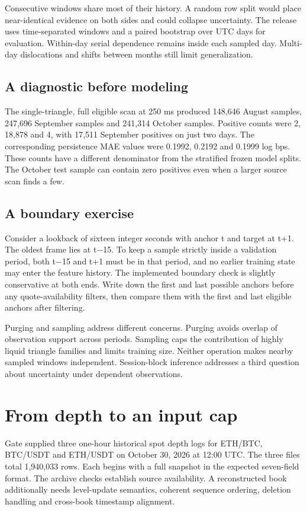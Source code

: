 \documentclass[11pt,oneside,openany]{book}
\begin{document}
Consecutive windows share most of their history. A random row split would place near-identical evidence on both sides and could collapse uncertainty. The release uses time-separated windows and a paired bootstrap over UTC days for evaluation. Within-day serial dependence remains inside each sampled day. Multi-day dislocations and shifts between months still limit generalization.

\section*{A diagnostic before modeling}
The single-triangle, full eligible scan at 250 ms produced 148,646 August samples, 247,696 September samples and 241,314 October samples. Positive counts were 2, 18,878 and 4, with 17,511 September positives on just two days. The corresponding persistence MAE values were 0.1992, 0.2192 and 0.1999 log bps. These counts have a different denominator from the stratified frozen model splits. The October test sample can contain zero positives even when a larger source scan finds a few.

\section*{A boundary exercise}
Consider a lookback of sixteen integer seconds with anchor t and target at t+1. The oldest frame lies at t\ensuremath{-}15. To keep a sample strictly inside a validation period, both t\ensuremath{-}15 and t+1 must be in that period, and no earlier training state may enter the feature history. The implemented boundary check is slightly conservative at both ends. Write down the first and last possible anchors before any quote-availability filters, then compare them with the first and last eligible anchors after filtering.

Purging and sampling address different concerns. Purging avoids overlap of observation support across periods. Sampling caps the contribution of highly liquid triangle families and limits training size. Neither operation makes nearby sampled windows independent. Session-block inference addresses a third question about uncertainty under dependent observations.

\chapter{From depth to an input cap}
Gate supplied three one-hour historical spot depth logs for ETH/BTC, BTC/USDT and ETH/USDT on October 30, 2026 at 12:00 UTC. The three files total 1,940,033 rows. Each begins with a full snapshot in the expected seven-field format. The archive checks establish source availability. A reconstructed book additionally needs level-update semantics, coherent sequence ordering, deletion handling and cross-book timestamp alignment.
\end{document}
